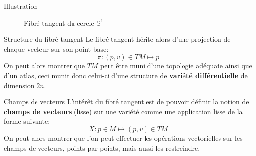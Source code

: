 \documentclass{beamer}
\begin{document}
        \begin{frame}{Illustration}
            \begin{figure}[h]
                \centering
                \caption{Fibré tangent du cercle \( \mathbb{S}^1 \)}
            \end{figure}
        \end{frame}     
        \begin{frame}{Structure du fibré tangent} 
            Le fibré tangent hérite alors d'une projection de chaque vecteur sur son point base:
            \[ 
                \pi : (p, v) \in TM \mapsto p
            \]
            On peut alors montrer que \( TM \) peut être muni d'une topologie adéquate ainsi que d'un atlas, ceci munit donc celui-ci d'une structure de \textbf{variété différentielle} de dimension \( 2n \).
        \end{frame} 
        \begin{frame}{Champs de vecteurs} 
            L'intérêt du fibré tangent est de pouvoir définir la notion de \textbf{champs de vecteurs} (lisse) sur une variété comme une application lisse de la forme suivante:
            \[ 
                X : p \in M \mapsto (p, v) \in TM
            \]
            On peut alors montrer que l'on peut effectuer les opérations vectorielles sur les champs de vecteurs, points par points, mais aussi les restreindre.
        \end{frame}
\end{document}
